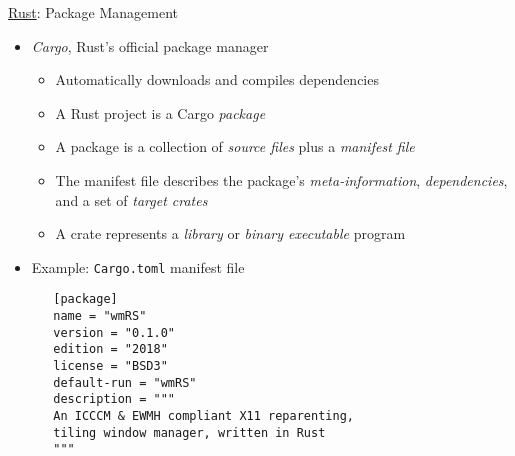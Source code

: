 \begin{frame}[c,fragile]{\underline{Rust}: Package Management \hfill {\footnotesize \currentname}}

    \begin{itemize}

        \item \textit{Cargo}, Rust's official package manager\\
            \begin{itemize}
                \item Automatically downloads and compiles dependencies
                \item A Rust project is a Cargo \textit{package}
                \item A package is a collection of \textit{source files} plus a \textit{manifest file}
                \item The manifest file describes the package's \textit{meta-information}, \textit{dependencies}, and a set of \textit{target crates}
                \item A crate represents a \textit{library} or \textit{binary executable} program
            \end{itemize}

        \item Example: \texttt{Cargo.toml} manifest file\\
\begin{verbatim}
   [package]
   name = "wmRS"
   version = "0.1.0"
   edition = "2018"
   license = "BSD3"
   default-run = "wmRS"
   description = """
   An ICCCM & EWMH compliant X11 reparenting,
   tiling window manager, written in Rust
   """
\end{verbatim}

    \end{itemize}

\end{frame}

